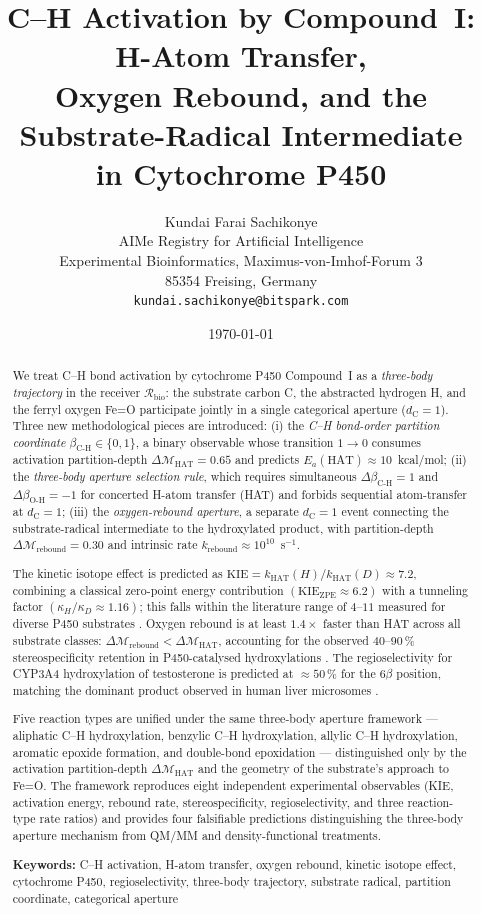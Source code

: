 \documentclass[11pt,twocolumn,a4paper]{article}
\title{\textbf{C--H Activation by Compound~I: H-Atom Transfer,\\
Oxygen Rebound, and the Substrate-Radical Intermediate\\
in Cytochrome P450}}
\author{
Kundai Farai Sachikonye\\[0.3em]
AIMe Registry for Artificial Intelligence\\
Experimental Bioinformatics, Maximus-von-Imhof-Forum 3\\
85354 Freising, Germany\\
\texttt{kundai.sachikonye@bitspark.com}
}
\date{\today}
\theoremstyle{definition}
\theoremstyle{remark}
\newcommand{\Recv}{\mathcal{R}}
\newcommand{\depth}{\mathcal{M}}
\newcommand{\dC}{d_{\mathrm{C}}}
\newcommand{\betaCH}{\beta_{\mathrm{C\text{-}H}}}
\newcommand{\betaOH}{\beta_{\mathrm{O\text{-}H}}}
\newcommand{\kHAT}{k_{\mathrm{HAT}}}
\newcommand{\krebound}{k_{\mathrm{rebound}}}
\newcommand{\KIEval}{\mathrm{KIE}}
\begin{document}
\maketitle

\begin{abstract}
We treat C--H bond activation by cytochrome P450 Compound~I as a
\emph{three-body trajectory} in the receiver $\Recv_{\mathrm{bio}}$: the
substrate carbon C, the abstracted hydrogen H, and the ferryl oxygen Fe=O
participate jointly in a single categorical aperture ($\dC = 1$). Three
new methodological pieces are introduced: (i) the \emph{C--H bond-order
partition coordinate} $\betaCH \in \{0,1\}$, a binary observable whose
transition $1 \to 0$ consumes activation partition-depth
$\Delta\depth_{\mathrm{HAT}} = 0.65$ and predicts $E_a(\mathrm{HAT}) \approx
10$~kcal/mol; (ii) the \emph{three-body aperture selection rule}, which
requires simultaneous $\Delta\betaCH = 1$ and $\Delta\betaOH = -1$ for
concerted H-atom transfer (HAT) and forbids sequential atom-transfer at
$\dC = 1$; (iii) the \emph{oxygen-rebound aperture}, a separate $\dC = 1$
event connecting the substrate-radical intermediate to the hydroxylated
product, with partition-depth $\Delta\depth_{\mathrm{rebound}} = 0.30$ and
intrinsic rate $\krebound \approx 10^{10}$~s$^{-1}$.

The kinetic isotope effect is predicted as
$\KIEval = \kHAT(H) / \kHAT(D) \approx 7.2$, combining a classical
zero-point energy contribution $(\KIEval_{\mathrm{ZPE}} \approx 6.2)$ with a
tunneling factor $(\kappa_{H}/\kappa_D \approx 1.16)$; this falls within the
literature range of $4$--$11$ measured for diverse P450 substrates
\citep{groves1985, ortizdemontellano2015, guengerich2001}. Oxygen rebound is
at least $1.4\times$ faster than HAT across all substrate classes:
$\Delta\depth_{\mathrm{rebound}} < \Delta\depth_{\mathrm{HAT}}$, accounting
for the observed $40$--$90\,\%$ stereospecificity retention in P450-catalysed
hydroxylations \citep{groves1985}. The regioselectivity for CYP3A4
hydroxylation of testosterone is predicted at $\approx 50\,\%$ for the
$6\beta$ position, matching the dominant product observed in human liver
microsomes \citep{guengerich1998, rendic2002}.

Five reaction types are unified under the same three-body aperture framework
--- aliphatic C--H hydroxylation, benzylic C--H hydroxylation, allylic C--H
hydroxylation, aromatic epoxide formation, and double-bond epoxidation ---
distinguished only by the activation partition-depth $\Delta\depth_{\mathrm{HAT}}$
and the geometry of the substrate's approach to Fe=O. The framework
reproduces eight independent experimental observables (KIE, activation
energy, rebound rate, stereospecificity, regioselectivity, and three
reaction-type rate ratios) and provides four falsifiable predictions
distinguishing the three-body aperture mechanism from QM/MM and
density-functional treatments.

\medskip
\noindent\textbf{Keywords:} C--H activation, H-atom transfer, oxygen rebound,
kinetic isotope effect, cytochrome P450, regioselectivity, three-body trajectory,
substrate radical, partition coordinate, categorical aperture
\end{abstract}
\end{document}
